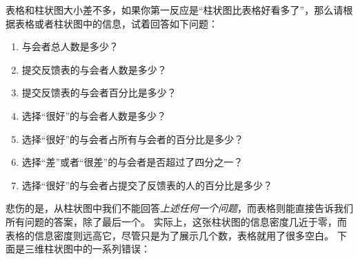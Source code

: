 \bohs

表格和柱状图大小差不多，如果你第一反应是“柱状图比表格好看多了”，那么请根据表格或者柱状图中的信息，试着回答如下问题：

\eohs

\begin{enumerate}
\item
  与会者总人数是多少？
\item
  提交反馈表的与会者人数是多少？
\item
  提交反馈表的与会者百分比是多少？
\item
  选择“很好”的与会者人数是多少？
\item
  选择“很好”的与会者占所有与会者的百分比是多少？
\item
  选择“差”或者“很差”的与会者是否超过了四分之一？
\item
  选择“很好”的与会者占提交了反馈表的人的百分比是多少？

\end{enumerate}

\bohs

悲伤的是，从柱状图中我们不能回答\emph{上述任何一个问题}，而表格则能直接告诉我们所有问题的答案，除了最后一个。
实际上，这张柱状图的信息密度几近于零，而表格的信息密度则远高它，尽管只是为了展示几个数，表格就用了很多空白。
下面是三维柱状图中的一系列错误：
\eohs

